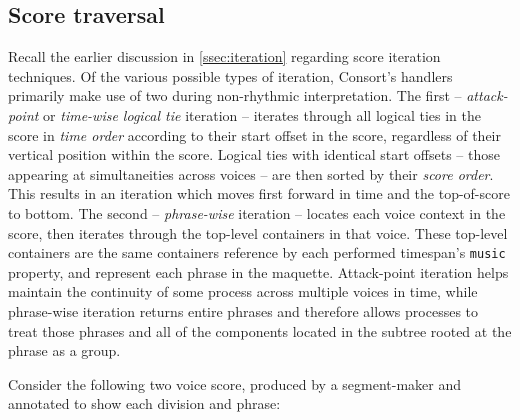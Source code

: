 \subsection{Score traversal}
\label{ssec:score-traversal}

Recall the earlier discussion in \autoref{ssec:iteration} regarding score
iteration techniques. Of the various possible types of iteration, Consort's
handlers primarily make use of two during non-rhythmic interpretation. The
first -- \emph{attack-point} or \emph{time-wise logical tie} iteration --
iterates through all logical ties in the score in \emph{time order} according
to their start offset in the score, regardless of their vertical position
within the score. Logical ties with identical start offsets -- those appearing
at simultaneities across voices -- are then sorted by their \emph{score order}.
This results in an iteration which moves first forward in time and the
top-of-score to bottom. The second -- \emph{phrase-wise} iteration -- locates
each voice context in the score, then iterates through the top-level containers
in that voice. These top-level containers are the same containers reference by
each performed timespan's \texttt{music} property, and represent each phrase in
the maquette. Attack-point iteration helps maintain the continuity of some
process across multiple voices in time, while phrase-wise iteration returns
entire phrases and therefore allows processes to treat those phrases and all of
the components located in the subtree rooted at the phrase as a group.

Consider the following two voice score, produced by a segment-maker and
annotated to show each division and phrase:

\begin{comment}
<abjad>[stylesheet=../consort.ily]
music_specifier = consort.MusicSpecifier(
    attachment_handler=consort.AttachmentHandler(),
    rhythm_maker=rhythmmakertools.TaleaRhythmMaker(
        extra_counts_per_division=(0, 1),
        talea=rhythmmakertools.Talea([2, 3, 2, 4], 16),
        ),
    )
timespan_maker = consort.TaleaTimespanMaker(
    initial_silence_talea=rhythmmakertools.Talea([0, 1], 4),
    playing_groupings=(1, 2, 2, 1, 2),
    playing_talea=rhythmmakertools.Talea([2, 3], 8),
    silence_talea=rhythmmakertools.Talea([1, 2, 3, 4], 8),
    )
music_setting = consort.MusicSetting(
    timespan_maker=timespan_maker,
    v1=music_specifier,
    v2=music_specifier,
    )
segment_maker = consort.SegmentMaker(
    desired_duration_in_seconds=8,
    discard_final_silence=True,
    permitted_time_signatures=[(2, 4), (5, 16), (3, 4)],
    score_template=templatetools.GroupedRhythmicStavesScoreTemplate(
        staff_count=2,
        with_clefs=True,
        ),
    settings=[music_setting],
    tempo=indicatortools.Tempo((1, 4), 72),
    )
illustration, metadata = segment_maker(annotate=True, verbose=False)
show(illustration)
</abjad>
\end{comment}

